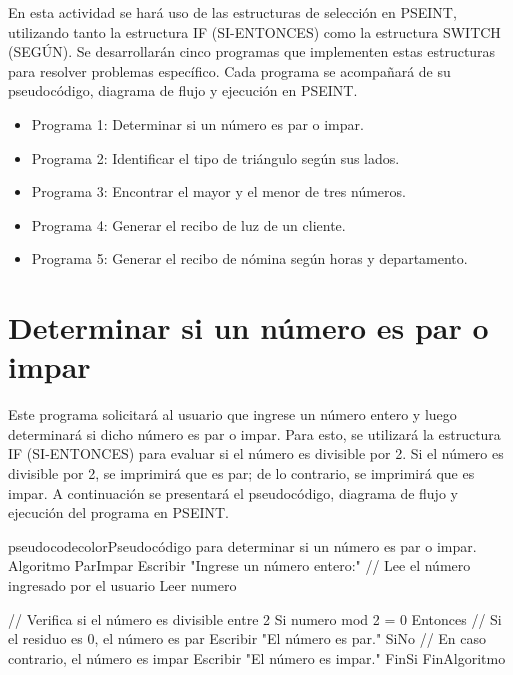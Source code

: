 

En esta actividad se hará uso de las estructuras de selección en PSEINT, utilizando tanto la estructura IF (SI-ENTONCES) como la estructura SWITCH (SEGÚN). Se desarrollarán cinco programas que implementen estas estructuras para resolver problemas específico. Cada programa se acompañará de su pseudocódigo, diagrama de flujo y ejecución en PSEINT.

\begin{itemize}
    \item Programa 1: Determinar si un número es par o impar.
    \item Programa 2: Identificar el tipo de triángulo según sus lados.
    \item Programa 3: Encontrar el mayor y el menor de tres números.
    \item Programa 4: Generar el recibo de luz de un cliente.
    \item Programa 5: Generar el recibo de nómina según horas y departamento.
\end{itemize}

\section{Determinar si un número es par o impar}

Este programa solicitará al usuario que ingrese un número entero y luego determinará si dicho número es par o impar. Para esto, se utilizará la estructura IF (SI-ENTONCES) para evaluar si el número es divisible por 2. Si el número es divisible por 2, se imprimirá que es par; de lo contrario, se imprimirá que es impar. A continuación se presentará el pseudocódigo, diagrama de flujo y ejecución del programa en PSEINT.

\begin{sourcecode}{pseudocodecolor}{Pseudocódigo para determinar si un número es par o impar.}
Algoritmo ParImpar
    Escribir "Ingrese un número entero:"
    // Lee el número ingresado por el usuario
    Leer numero
	
    // Verifica si el número es divisible entre 2
    Si numero mod 2 = 0 Entonces
        // Si el residuo es 0, el número es par
        Escribir "El número es par."
    SiNo
        // En caso contrario, el número es impar
        Escribir "El número es impar."
    FinSi
FinAlgoritmo
\end{sourcecode}



